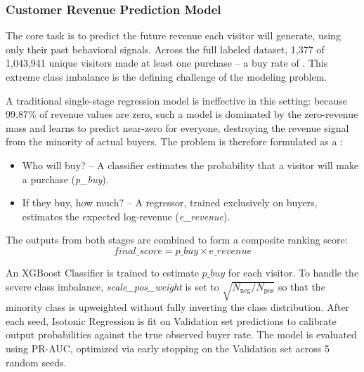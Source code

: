 \documentclass[conference]{IEEEtran}
\begin{document}
\vspace{0.5em}
\subsubsection{Customer Revenue Prediction Model}

The core task is to predict the future revenue each visitor will
generate, using only their past behavioral signals. Across the full
labeled dataset, 1,377 of 1,043,941 unique visitors made at least
one purchase -- a buy rate of . This extreme class
imbalance is the defining challenge of the modeling problem.

A traditional single-stage regression model is ineffective in this
setting: because 99.87\% of revenue values are zero, such a model
is dominated by the zero-revenue mass and learns to predict near-zero
for everyone, destroying the revenue signal from the minority of
actual buyers. The problem is therefore formulated as a
:

\begin{itemize}

\item Who will buy? -- A classifier estimates the
probability that a visitor will make a purchase
(\textit{p\_buy}).

\item If they buy, how much? -- A regressor, trained
exclusively on buyers, estimates the expected log-revenue
(\textit{e\_revenue}).

\end{itemize}

The outputs from both stages are combined to form a composite ranking score:
\begin{equation}
\mathit{final\_score} = \mathit{p\_buy} \times \mathit{e\_revenue}
\end{equation}

\vspace{0.5em}
\noindent{}
\vspace{0.3em}

An XGBoost Classifier is trained to estimate $p\_buy$ for each
visitor. To handle the severe class imbalance,
\textit{scale\_pos\_weight} is set to
$\sqrt{N_{\text{neg}} / N_{\text{pos}}}$
so that the minority class is upweighted without fully inverting
the class distribution. After each seed, Isotonic
Regression is fit on Validation set predictions to calibrate
output probabilities against the true observed buyer rate.
The model is evaluated using PR-AUC, optimized via early stopping
on the Validation set across 5 random seeds.
\end{document}
